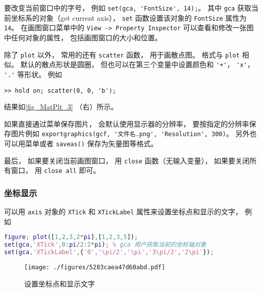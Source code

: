 要改变当前窗口中的字号， 例如 \verb|set(gca, 'FontSize', 14);|。 其中 \verb|gca| 获取当前坐标系的对象（get current axis）， \verb|set| 函数设置该对象的 \verb|FontSize| 属性为 \verb|14|。 在画图窗口菜单中的 \verb|View -> Property Inspector| 可以查看和修改一张图中任何对象的属性， 包括画图窗口的大小和位置。

除了 \verb|plot| 以外， 常用的还有 \verb|scatter| 函数， 用于画散点图。 格式与 \verb|plot| 相似。 默认的散点形状是圆圈， 但也可以在第三个变量中设置颜色和 \verb|'+'|， \verb|'x'|， \verb|'.'| 等形状。 例如
\begin{lstlisting}[language=matlabC]
>> hold on; scatter(0, 0, 'b');
\end{lstlisting}
结果如\autoref{fig_MatPlt_3} （右）所示。

如果直接通过菜单保存图片， 会默认使用显示器的分辨率， 要按指定的分辨率保存图片例如 \verb|exportgraphics(gcf, '文件名.png', 'Resolution', 300)|。 另外也可以用菜单或者 \verb|saveas()| 保存为矢量图等格式。

最后， 如果要关闭当前画图窗口， 用 \verb|close| 函数（无输入变量）， 如果要关闭所有窗口， 用 \verb|close all| 即可。

\subsubsection{坐标显示}
可以用 \verb|axis| 对象的 \verb|XTick| 和 \verb|XTickLabel| 属性来设置坐标点和显示的文字， 例如 
\begin{lstlisting}[language=matlab]
figure; plot([1,2,3,2*pi],[1,2,3,5]);
set(gca,'XTick',0:pi/2:2*pi); % gca 用户获取当前的坐标轴对象
set(gca,'XTickLabel',{'0','\pi/2','\pi','3\pi/2','2\pi'});
\end{lstlisting}
\begin{figure}[ht]
\centering
\texttt{[image: ./figures/5283caea47d60abd.pdf]}
\caption{设置坐标点和显示文字} \label{fig_MatPlt_4}
\end{figure}
